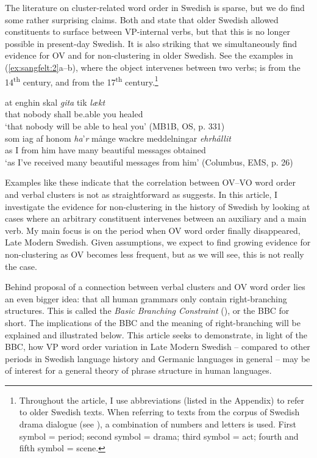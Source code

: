 \documentclass[output=paper, colorlinks, citecolor=brown]{langscibook}
\begin{document}
The literature on cluster-related word order in Swedish is sparse, but we do find some rather surprising claims. Both \citet[171–172]{Falk1993} and \citet[157]{Petzell2011} state that older Swedish allowed constituents to surface between VP-internal verbs, but that this is no longer possible in present-day Swedish. It is also striking that we simultaneously find evidence for OV and for non-clustering in older Swedish. See the examples in (\ref{ex:sangfelt:2}a–b), where the object intervenes between two verbs;  is from the 14\textsuperscript{th} century, and  from the 17\textsuperscript{th} century.\footnote{Throughout the article, I use abbreviations (listed in the Appendix) to refer to older Swedish texts. When referring to texts from the corpus of Swedish drama dialogue (see ), a combination of numbers and letters is used. First symbol = period; second symbol = drama; third symbol = act; fourth and fifth symbol = scene.}


\ea
\label{ex:sangfelt:2}
\ea\label{ex:sangfelt:2a}
\gll at enghin skal \textit{gita} {tik} \textit{lækt} \\
that nobody shall be.able you healed\\
\glt ‘that nobody will be able to heal you’ (MB1B, OS, p. 331)\\

\ex \label{ex:sangfelt:2b}
\gll som iag af honom \textit{ha}’\textit{r} {månge} {wackre} {meddelningar} \textit{ehrhållit}\\
 as I from him have many beautiful messages obtained \\
\glt ‘as I’ve received many beautiful messages from him’ (Columbus, EMS, p. 26)\\
\z
\z


Examples like these indicate that the correlation between OV–VO word order and verbal clusters is not as straightforward as \citet{Haider2010} suggests. In this article, I investigate the evidence for non-clustering in the history of Swedish by looking at cases where an arbitrary constituent intervenes between an auxiliary and a main verb. My main focus is on the period when OV word order finally disappeared, Late Modern Swedish. Given  assumptions, we expect to find growing evidence for non-clustering as OV becomes less frequent, but as we will see, this is not really the case.


Behind  proposal of a connection between verbal clusters and OV word order lies an even bigger idea: that all human grammars only contain right-branching structures. This is called the \textit{Basic Branching Constraint} (\citealt{Haider2010, Haider2013}), or the BBC for short. The implications of the BBC and the meaning of right-branching will be explained and illustrated below. This article seeks to demonstrate, in light of the BBC, how VP word order variation in Late Modern Swedish – compared to other periods in Swedish language history and Germanic languages in general – may be of interest for a general theory of phrase structure in human languages.
\end{document}
